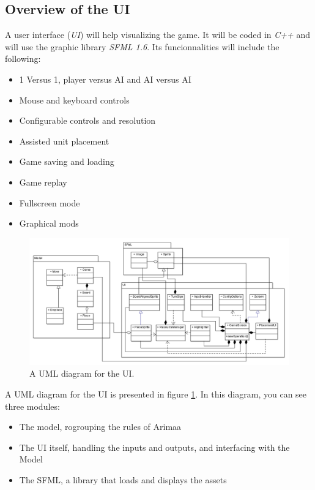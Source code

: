 \subsection{Overview of the UI}

A user interface (\emph{UI}) will help visualizing the game.
It will be coded in \emph{C++} and will use the graphic library \emph{SFML 1.6}.
Its funcionnalities will include the following:
\begin{itemize}
	\item 1 Versus 1, player versus AI and AI versus AI
	\item Mouse and keyboard controls
	\item Configurable controls and resolution
	\item Assisted unit placement
	\item Game saving and loading
	\item Game replay
	\item Fullscreen mode
	\item Graphical mods
\end{itemize}

\begin{figure}[!h]
\centering
\includegraphics[width=\textwidth]{Gui/Img/Application_UML.png}
\caption{A UML diagram for the UI.}
\label{fig:UML_UI}
\end{figure}

A UML diagram for the UI is presented in figure \ref{fig:UML_UI}.
In this diagram, you can see three modules:
\begin{itemize}
	\item The model, rogrouping the rules of Arimaa
	\item The UI itself, handling the inputs and outputs, and interfacing with the Model
	\item The SFML, a library that loads and displays the assets
\end{itemize}

